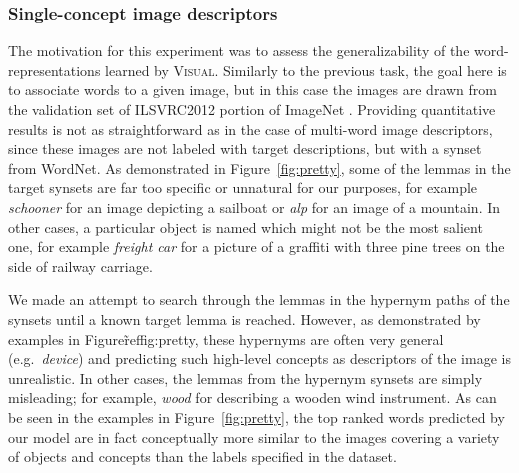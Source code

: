 \subsubsection{Single-concept image descriptors}
The motivation for this experiment was to assess
the generalizability of the word-representations learned by \textsc{Visual}.
Similarly to the previous task, the goal here is to associate words to a
given image, but in this case the images are drawn from the
validation set of ILSVRC2012 portion of ImageNet
\cite{ILSVRCarxiv14}. Providing quantitative results is not as
straightforward as in the case of multi-word image descriptors, since
these images are not labeled with target descriptions, but with a
synset from WordNet. As demonstrated in Figure~\ref{fig:pretty}, some of
the lemmas in the target synsets are far too specific or unnatural for our
purposes, for example {\it schooner} for an image
depicting a sailboat or {\it alp} for an image of a mountain.
In other cases, a particular object is named which
might not be the most salient one, for example {\it freight car} for a
picture of a graffiti with three pine trees on the side of railway carriage.

We made an attempt to search through the lemmas in the hypernym paths
of the synsets until a known target lemma is reached. However, as
demonstrated by examples in Figure\~ref{fig:pretty}, these hypernyms are
often very general (e.g.\ {\it device}) and predicting such high-level
concepts as descriptors of the image is unrealistic. In other cases,
the lemmas from the hypernym synsets are simply misleading; for
example, {\it wood} for describing a wooden wind instrument. As can be
seen in the examples in Figure~\ref{fig:pretty}, the top ranked words
predicted by our model are in fact conceptually more similar to the
images covering a variety of objects and concepts than the labels
specified in the dataset.



